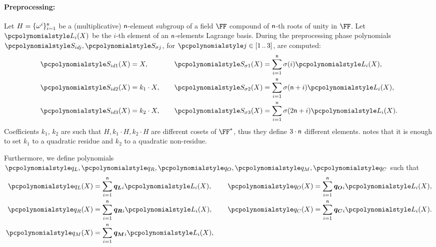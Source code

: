 \documentclass[runningheads,10pt]{llncs}
\begin{document}
\paragraph{Preprocessing:}
Let $H = \{\omega^i\}_{i = 1}^{\mathsf{n} }$ be a
(multiplicative) $\mathsf{n}$-element subgroup of a field $\FF$
compound of $\mathsf{n}$-th roots of unity in $\FF$. Let $\lag_i(X)$ be
the $i$-th element of an $\mathsf{n}$-elements Lagrange basis. During
the preprocessing phase polynomials $\p{S_{id j}}, \p{S_{\sigma j}}$, for
$\p{j} \in \range{1}{3}$, are computed:
\begin{equation*}
  \begin{aligned}
    \p{S_{id 1}}(X) & = X,\vphantom{\sum_{i = 1}^{\noofc} \sigma(i) \lag_i(X),}\\
    \p{S_{id 2}}(X) & = k_1 \cdot X,\vphantom{\sum_{i = 1}^{\noofc} \sigma(i) \lag_i(X),}\\
    \p{S_{id 3}}(X) & = k_2 \cdot X,\vphantom{\sum_{i = 1}^{\noofc} \sigma(i) \lag_i(X),}
  \end{aligned}
  \qquad
\begin{aligned}
  \p{S_{\sigma 1}}(X) & = \sum_{i = 1}^{\noofc} \sigma(i) \lag_i(X),\\
  \p{S_{\sigma 2}}(X) & = \sum_{i = 1}^{\noofc}
  \sigma(\noofc + i) \lag_i(X),\\
  \p{S_{\sigma 3}}(X) & =\sum_{i = 1}^{\noofc} \sigma(2 \noofc + i) \lag_i(X).
\end{aligned}
\end{equation*}
Coefficients $k_1$, $k_2$ are such that $H, k_1 \cdot H, k_2 \cdot H$ are
different cosets of $\FF^*$, thus they define $3 \cdot \mathsf{n}$
different elements. \cite{EPRINT:GabWilCio19} notes that it is enough to set
$k_1$ to a quadratic residue and $k_2$ to a quadratic non-residue.

Furthermore, we define polynomials $\p{q_L}, \p{q_R}, \p{q_O}, \p{q_M}, \p{q_C}$
such that
\begin{equation*}
  \begin{aligned}
  \p{q_L}(X) & = \sum_{i = 1}^{\noofc} \vql_i \lag_i(X), \\
  \p{q_R}(X) & = \sum_{i = 1}^{\noofc} \vqr_i \lag_i(X), \\
  \p{q_M}(X) & = \sum_{i = 1}^{\noofc} \vqm_i \lag_i(X),
\end{aligned}
\qquad
\begin{aligned}
  \p{q_O}(X) & = \sum_{i = 1}^{\noofc} \vqo_i \lag_i(X), \\
  \p{q_C}(X) & = \sum_{i = 1}^{\noofc} \vqc_i \lag_i(X). \\
  \vphantom{\p{q_M}(X)  = \sum_{i = 1}^{\noofc} \vqm_i \lag_i(X),}
\end{aligned}
\end{equation*}
\end{document}
